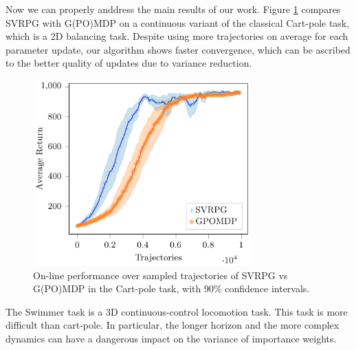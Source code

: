 Now we can properly anddress the main results of our work. Figure \ref{fig:cartpole} compares \acs{SVRPG} with G(PO)MDP on a continuous variant of the classical Cart-pole task, which is a 2D balancing task. Despite using more trajectories on average for each parameter update, our algorithm shows faster convergence, which can be ascribed to the better quality of updates due to variance reduction.
\begin{figure}[h]
	\begin{minipage}[h]{1\textwidth}
		\centering
		\includegraphics[width=0.75\textwidth]{Images/Experiments/cart_pole_SVRPG_vs_GPOMDP_tex.pdf}
		\vspace{-0.1in}
		\caption{On-line performance over sampled trajectories of \acs{SVRPG} vs G(PO)MDP in the Cart-pole task, with 90\% confidence intervals.}
		\label{fig:cartpole}
	\end{minipage}
	\vspace{-0.15in}
\end{figure}

The Swimmer task is a 3D continuous-control locomotion task. This task is more difficult than cart-pole. In particular, the longer horizon and the more complex dynamics can have a dangerous impact on the variance of importance weights.

